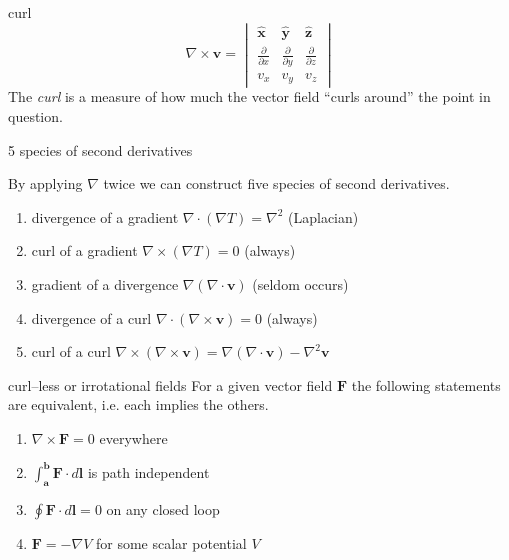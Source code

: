 \documentclass[avery5371,grid]{flashcards}
\newcommand{\xhat}[0]{\mathbf{\hat x}}
\newcommand{\yhat}[0]{\mathbf{\hat y}}
\newcommand{\zhat}[0]{\mathbf{\hat z}}
\begin{document}
\begin{flashcard}[Definition]{curl}
\begin{displaymath}
\nabla \times \mathbf v  =
\begin{vmatrix}
\xhat & \yhat & \zhat\\
\frac{\partial}{\partial x} &
\frac{\partial}{\partial y} &
\frac{\partial}{\partial z}\\
v_x & v_y & v_z
\end{vmatrix}
\end{displaymath}
The \textit{curl} is a measure of how much the vector field ``curls around''
the point in question.
\end{flashcard}

\begin{flashcard}[Definition]{5 species of second derivatives}
\begin{small}
By applying $\nabla$ twice we can construct five species of second derivatives.
\begin{enumerate}
\item divergence of a gradient $\nabla \cdot (\nabla T) = \nabla^2$ (Laplacian)
\item curl of a gradient $\nabla \times (\nabla T) = 0$ (always)
\item gradient of a divergence $\nabla(\nabla \cdot \mathbf v)$ (seldom occurs)
\item divergence of a curl $\nabla \cdot (\nabla \times \mathbf v) = 0$ (always)
\item curl of a curl $\nabla \times (\nabla \times \mathbf v) = 
\nabla(\nabla \cdot \mathbf v) - \nabla^2 \mathbf v$
\end{enumerate}
\end{small}
\end{flashcard}

\begin{flashcard}[Theorem]{curl--less or irrotational fields}
For a given vector field $\mathbf F$ the following statements are equivalent, i.e. each implies the others.
\begin{enumerate}
\item $\nabla \times \mathbf F = 0$ everywhere
\item $\int_{\mathbf a}^{\mathbf b} \mathbf F \cdot d \mathbf l$ is path independent
\item $\oint \mathbf F \cdot d \mathbf l = 0$ on any closed loop
\item $\mathbf F = -\nabla V$ for some scalar potential $V$
\end{enumerate}
\end{flashcard}
\end{document}
